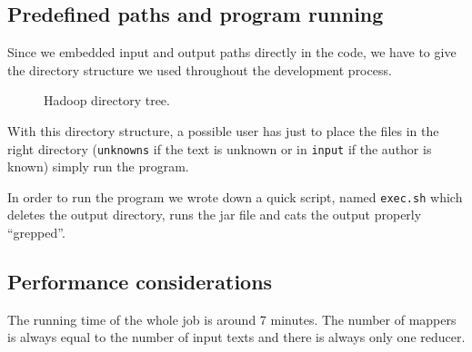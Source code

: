 \documentclass[a4paper,11pt, twoside]{article}
\begin{document}
	\subsection{Predefined paths and program running}
	Since we embedded input and output paths directly in the code, we have to give the directory structure we used throughout the development process. 
	\begin{figure}[h!]
	\caption{Hadoop directory tree.}
	\end{figure}

	With this directory structure, a possible user has just to place the files in the right directory (\lstinline|unknowns| if the text is unknown or in \lstinline|input| if the author is known) simply run the program.
	
	In order to run the program we wrote down a quick script, named \lstinline|exec.sh| which deletes the output directory, runs the jar file and cats the output properly ``grepped''.

	\subsection{Performance considerations} %
	The running time of the whole job is around 7 minutes. The number of mappers is always equal to the number of input texts and there is always only one reducer.
	

	\newpage
	\printbibheading
	\printbibliography[nottype=book,heading=subbibliography,title={Online Sources}]
\end{document}
